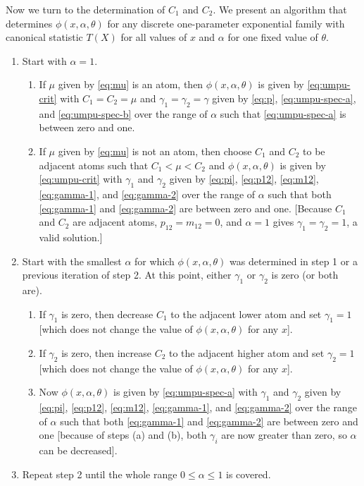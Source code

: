 \documentclass{article}
\begin{document}
Now we turn to the determination of $C_1$ and $C_2$.  We present an algorithm
\label{pg:algo}
that determines $\phi(x, \alpha, \theta)$ for any discrete one-parameter
exponential family with canonical statistic $T(X)$ for all values
of $x$ and $\alpha$ for one fixed value of $\theta$.
\begin{enumerate}
\item Start with $\alpha = 1$.
\begin{enumerate}
\item If $\mu$ given by \eqref{eq:mu} is an atom, then
$\phi(x, \alpha, \theta)$ is given by
\eqref{eq:umpu-crit} with $C_1 = C_2 = \mu$
and $\gamma_1 = \gamma_2 = \gamma$
given by \eqref{eq:p}, \eqref{eq:umpu-spec-a}, and \eqref{eq:umpu-spec-b}
over the range of $\alpha$ such that
\eqref{eq:umpu-spec-a} is between zero and one.
\item If $\mu$ given by \eqref{eq:mu} is not an atom, then choose $C_1$
and $C_2$ to be adjacent atoms such that $C_1 < \mu < C_2$ and
$\phi(x, \alpha, \theta)$ is given by \eqref{eq:umpu-crit}
with $\gamma_1$ and $\gamma_2$ given by
\eqref{eq:pi}, \eqref{eq:p12}, \eqref{eq:m12},
\eqref{eq:gamma-1}, and \eqref{eq:gamma-2}
over the range of $\alpha$ such that both
\eqref{eq:gamma-1} and \eqref{eq:gamma-2} are between zero and one.
[Because $C_1$ and $C_2$ are adjacent atoms, $p_{1 2} = m_{1 2} = 0$,
and $\alpha = 1$ gives $\gamma_1 = \gamma_2 = 1$, a valid solution.]
\end{enumerate}
\item Start with the smallest $\alpha$ for which $\phi(x, \alpha, \theta)$
was determined in step 1 or a previous iteration of step 2.
At this point, either $\gamma_1$ or $\gamma_2$
is zero (or both are).
\begin{enumerate}
\item If $\gamma_1$ is zero, then decrease $C_1$ to the adjacent lower
atom and set $\gamma_1 = 1$ [which does not change the value
of $\phi(x, \alpha, \theta)$ for any $x$].
\item If $\gamma_2$ is zero, then increase $C_2$ to the adjacent higher
atom and set $\gamma_2 = 1$ [which does not change the value
of $\phi(x, \alpha, \theta)$ for any $x$].
\item Now $\phi(x, \alpha, \theta)$ is given by \eqref{eq:umpu-spec-a}
with $\gamma_1$ and $\gamma_2$ given by
\eqref{eq:pi}, \eqref{eq:p12}, \eqref{eq:m12},
\eqref{eq:gamma-1}, and \eqref{eq:gamma-2}
over the range of $\alpha$ such that both
\eqref{eq:gamma-1} and \eqref{eq:gamma-2} are between zero and one
[because of steps (a) and (b), both $\gamma_i$ are now greater than
zero, so $\alpha$ can be decreased].
\end{enumerate}
\item Repeat step 2 until the whole range $0 \le \alpha \le 1$ is covered.
\end{enumerate}
\end{document}
